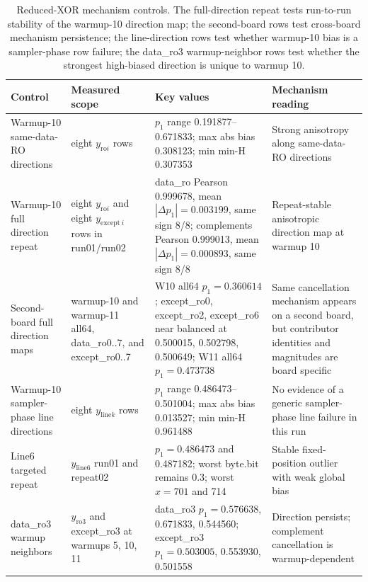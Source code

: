 \documentclass[journal]{IEEEtran}
\begin{document}
\begin{table}[!t]
\centering
\caption{Reduced-XOR mechanism controls. The full-direction repeat tests run-to-run stability of the warmup-10 direction map; the second-board rows test cross-board mechanism persistence; the line-direction rows test whether warmup-10 bias is a sampler-phase row failure; the data\_ro3 warmup-neighbor rows test whether the strongest high-biased direction is unique to warmup 10.}
\label{tab:reducedxormechanism}
\scriptsize
\begin{tabular}{@{}L{0.20\textwidth}L{0.25\textwidth}L{0.25\textwidth}L{0.22\textwidth}@{}}
\toprule
Control & Measured scope & Key values & Mechanism reading \\
\midrule
Warmup-10 same-data-RO directions & eight $y_{\mathrm{ro}i}$ rows & $p_1$ range 0.191877--0.671833; max abs bias 0.308123; min min-H 0.307353 & Strong anisotropy along same-data-RO directions \\
Warmup-10 full direction repeat & eight $y_{\mathrm{ro}i}$ and eight $y_{\mathrm{except}\ i}$ rows in run01/run02 & data\_ro Pearson 0.999678, mean $|\Delta p_1|=0.003199$, same sign 8/8; complements Pearson 0.999013, mean $|\Delta p_1|=0.000893$, same sign 8/8 & Repeat-stable anisotropic direction map at warmup 10 \\
Second-board full direction maps & warmup-10 and warmup-11 all64, data\_ro0..7, and except\_ro0..7 & W10 all64 $p_1=0.360614$; except\_ro0, except\_ro2, except\_ro6 near balanced at 0.500015, 0.502798, 0.500649; W11 all64 $p_1=0.473738$ & Same cancellation mechanism appears on a second board, but contributor identities and magnitudes are board specific \\
Warmup-10 sampler-phase line directions & eight $y_{\mathrm{line}k}$ rows & $p_1$ range 0.486473--0.501004; max abs bias 0.013527; min min-H 0.961488 & No evidence of a generic sampler-phase line failure in this run \\
Line6 targeted repeat & $y_{\mathrm{line}6}$ run01 and repeat02 & $p_1=0.486473$ and 0.487182; worst byte.bit remains 0.3; worst $x=701$ and 714 & Stable fixed-position outlier with weak global bias \\
data\_ro3 warmup neighbors & $y_{\mathrm{ro}3}$ and except\_ro3 at warmups 5, 10, 11 & data\_ro3 $p_1=0.576638$, 0.671833, 0.544560; except\_ro3 $p_1=0.503005$, 0.553930, 0.501558 & Direction persists; complement cancellation is warmup-dependent \\
\bottomrule
\end{tabular}
\end{table}
\end{document}
